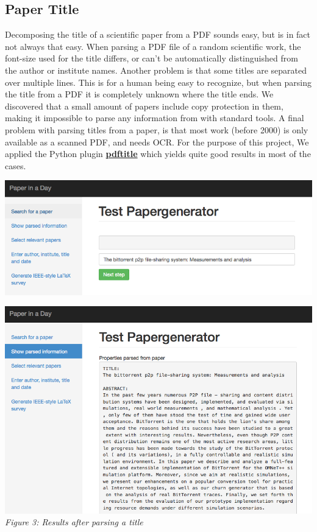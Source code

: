 \documentclass[12pt]{article}
\begin{document}
\subsection{Paper Title}
Decomposing the title of a scientific paper from a PDF sounds easy, but is in fact not always that easy. When parsing a PDF file of a random scientific work, the font-size used for the title differs, or can't be automatically distinguished from the author or institute names. Another problem is that some titles are separated over multiple lines. This is for a human being easy to recognize, but when parsing the title from a PDF it is completely unknown where the title ends. We discovered that a small amount of papers include copy protection in them, making it impossible to parse any information from with standard tools. A final problem with parsing titles from a paper, is that most work (before 2000) is only available as a scanned PDF, and needs OCR. For the purpose of this project, We applied the Python plugin \textbf{\href{https://github.com/djui/pdftitle}{pdftitle}} which yields quite good results in most of the cases.


\includegraphics[width=17cm]{../screenshots/title.png}

\includegraphics[width=17cm]{../screenshots/information.png}
\textit{\\Figure 3: Results after parsing a title}\\\\
\end{document}
